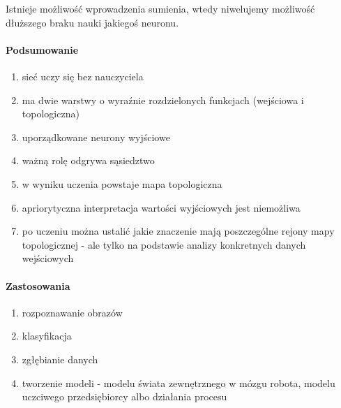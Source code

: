 Istnieje możliwość wprowadzenia sumienia, wtedy niwelujemy możliwość dłuższego braku nauki jakiegoś neuronu.

\paragraph{Podsumowanie}

\begin{enumerate}
 \item sieć uczy się bez nauczyciela
 \item ma dwie warstwy o wyraźnie rozdzielonych funkcjach (wejściowa i topologiczna)
 \item uporządkowane neurony wyjściowe
 \item ważną rolę odgrywa sąsiedztwo
 \item w wyniku uczenia powstaje mapa topologiczna
 \item apriorytyczna interpretacja wartości wyjściowych jest niemożliwa
 \item po uczeniu można ustalić jakie znaczenie mają poszczególne rejony mapy topologicznej - ale 
 tylko na podstawie analizy konkretnych danych wejściowych
\end{enumerate}

\paragraph{Zastosowania}

\begin{enumerate}
 \item rozpoznawanie obrazów
 \item klasyfikacja
 \item zgłębianie danych
 \item tworzenie modeli - modelu świata zewnętrznego w mózgu robota, modelu uczciwego przedsiębiorcy albo działania procesu
\end{enumerate}